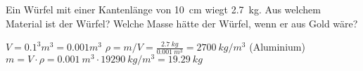 
\begin{aufgabe}
Ein Würfel mit einer Kantenlänge von \SI{10}{cm} wiegt \SI{2.7}{kg}. Aus welchem Material ist der Würfel?
Welche Masse hätte der Würfel, wenn er aus Gold wäre?

\begin{loesung}
$V = 0.1 ^3 m^3 = 0.001 m^3$ $\rho = m/V = \frac{\SI{2.7}{kg}}{\SI{0.001}{m^3}} = \SI{2700}{kg/m^3}$ (Aluminium)\\
$m = V \cdot \rho = \SI{0.001}{m^3} \cdot \SI{19290}{kg/m^3} = \SI{19.29}{kg}$\\
\end{loesung}
\end{aufgabe}
